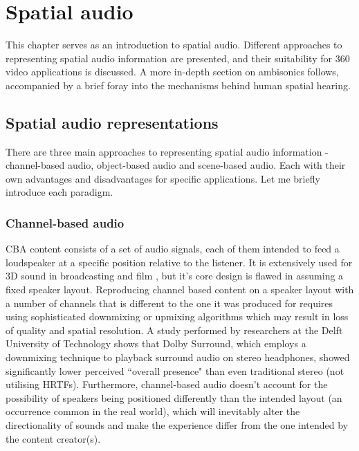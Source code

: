 \chapter{Spatial audio}

\begin{chapterabstract}
    This chapter serves as an introduction to spatial audio.
    Different approaches to representing spatial audio information are presented,
    and their suitability for 360\degree{} video applications is discussed.
    A more in-depth section on ambisonics follows, accompanied by a brief 
    foray into the mechanisms behind human spatial hearing.
\end{chapterabstract}

\section{Spatial audio representations}

There are three main approaches to representing spatial audio information -
channel-based audio, object-based audio and scene-based audio. \cite{ebu_sbo_hoa}\cite{mpeg_3d_article}\cite{sba_using_hoa}
Each with their own advantages and disadvantages for specific applications. Let me briefly introduce each paradigm. 

\subsection{Channel-based audio}
CBA content consists of a set of audio signals, each of them intended to feed a loudspeaker
at a specific position relative to the listener. \cite{mpeg_3d_article} 
It is extensively used for 3D sound in broadcasting and film \cite{ebu_sbo_hoa}\cite{mpeg_3d_article},
but it's core design is flawed in assuming a fixed speaker layout.
Reproducing channel based content on a speaker layout with a number of channels that is different to the one it was produced for
requires using sophisticated downmixing or upmixing algorithms which may result in loss of quality and spatial resolution. \cite{mpeg_3d_article}\cite{brinkman2015effect}
A study performed by researchers at the Delft University of Technology shows that Dolby Surround, which 
employs a downmixing technique \cite{dolby_digital} to playback surround audio on stereo headphones, 
showed significantly lower perceived ``overall presence" than even traditional stereo (not utilising HRTFs). \cite{hoekstra20133d}\cite{brinkman2015effect}
Furthermore, channel-based audio doesn't account for the possibility of speakers being positioned differently than the intended layout (an occurrence common in the real world),
which will inevitably alter the directionality of sounds and make the experience differ from the one intended by the content creator(s).

